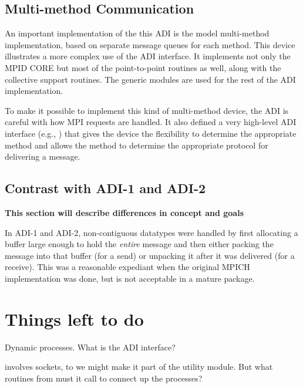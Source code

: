 \documentclass{article}
\begin{document}
\subsection{Multi-method Communication}
An important implementation of the this ADI is the model multi-method
implementation, based on separate message queues for each method.
This device illustrates a more complex use of the ADI interface.  It
implements not only the MPID CORE but most of the point-to-point
routines as well, along with the collective support routines.  The
generic modules are used for the rest of the ADI implementation.

To make it possible to implement this kind of multi-method device, the
ADI is careful with how MPI requests are handled.  It also defined a
very high-level ADI interface (e.g., ) that gives the
device the flexibility to determine the appropriate method and allows
the method to determine the appropriate protocol for delivering a message.

\subsection{Contrast with ADI-1 and ADI-2}
\label{sec-historical}
\textbf{This section will describe differences in concept and goals}

In ADI-1 and ADI-2, non-contiguous datatypes were handled by first
allocating a buffer large enough to hold the \emph{entire} message and
then either packing the message into that buffer (for a send) or
unpacking it after it was delivered (for a receive).  This was a
reasonable expediant when the original MPICH implementation was done,
but is not acceptable in a mature package.

\section{Things left to do}
Dynamic processes.  What is the ADI interface?

 involves sockets, to we might make it part of the
utility module.  But what routines from  must it call
to connect up the processes?

%

%
\end{document}
